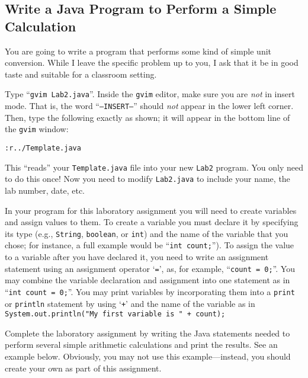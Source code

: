 \vspace*{-.1in}
\subsection*{Write a Java Program to Perform a Simple Calculation}

You are going to write a program that performs some kind of simple unit conversion. While I leave the specific problem
up to you, I ask that it be in good taste and suitable for a classroom setting.

 Type ``{\tt gvim Lab2.java}''. Inside the {\tt gvim} editor, make sure you are {\em
not} in insert mode. That is, the word ``{\tt --INSERT--}'' should {\em not} appear in the lower left corner. Then, type
the following exactly as shown; it will appear in the bottom line of the {\tt gvim} window:

\begin{center} \verb$:r../Template.java$ \end{center}

This ``reads'' your {\tt Template.java} file into your new {\tt Lab2} program.  You only need to do this once!  Now you
need to modify {\tt Lab2.java} to include your name, the lab number, date, etc.

In your program for this laboratory assignment you will need to create variables and assign values to them. To create a
variable you must declare it by specifying its type (e.g., {\tt String}, {\tt boolean}, or {\tt int}) and the name of
the variable that you chose; for instance, a full example would be ``{\tt int count;}'').  To assign the value to a
variable after you have declared it, you need to write an assignment statement using an assignment operator `{\tt =}',
as, for example, ``{\tt count = 0;}''. You may combine the variable declaration and assignment into one statement as in
``{\tt int count = 0;}''. You may print variables by incorporating them into a {\tt print} or {\tt println} statement by
using `{\tt +}' and the name of the variable as in {\tt System.out.println("My first variable is " + count);}

 Complete the laboratory assignment by writing the Java statements needed to perform several simple arithmetic
 calculations and print the results. See an example below. Obviously, you may not use this example---instead, you should
 create your own as part of this assignment.

